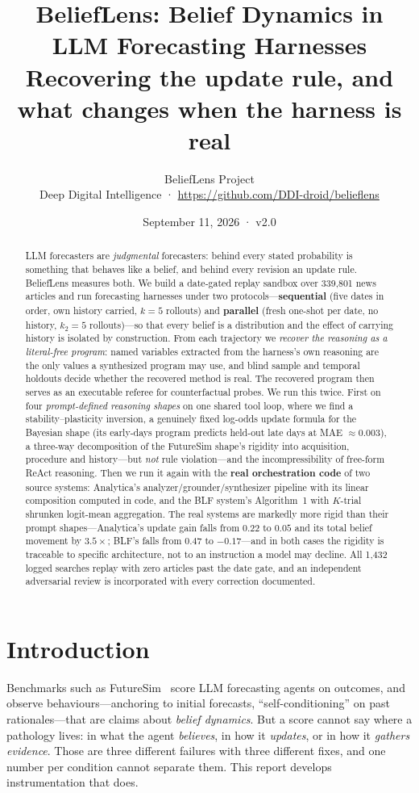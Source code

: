 \documentclass[10pt]{article}
\title{\textbf{BeliefLens: Belief Dynamics in LLM Forecasting Harnesses}\\[3pt]
\Large Recovering the update rule, and what changes when the harness is real}
\author{BeliefLens Project\\\small Deep Digital Intelligence \; · \;
\url{https://github.com/DDI-droid/belieflens}}
\date{September 11, 2026 \; · \; v2.0}
\begin{document}
\maketitle

\begin{abstract}
LLM forecasters are \emph{judgmental} forecasters: behind every stated probability is something
that behaves like a belief, and behind every revision an update rule. BeliefLens measures both.
We build a date-gated replay sandbox over 339{,}801 news articles and run forecasting harnesses
under two protocols---\textbf{sequential} (five dates in order, own history carried, $k{=}5$
rollouts) and \textbf{parallel} (fresh one-shot per date, no history, $k_2{=}5$ rollouts)---so
that every belief is a distribution and the effect of carrying history is isolated by
construction. From each trajectory we \emph{recover the reasoning as a literal-free program}:
named variables extracted from the harness's own reasoning are the only values a synthesized
program may use, and blind sample and temporal holdouts decide whether the recovered method is
real. The recovered program then serves as an executable referee for counterfactual probes.
We run this twice. First on four \emph{prompt-defined reasoning shapes} on one shared tool loop,
where we find a stability--plasticity inversion, a genuinely fixed log-odds update formula for
the Bayesian shape (its early-days program predicts held-out late days at MAE ${\approx}0.003$),
a three-way decomposition of the FutureSim shape's rigidity into acquisition, procedure and
history---but \emph{not} rule violation---and the incompressibility of free-form ReAct reasoning.
Then we run it again with the \textbf{real orchestration code} of two source
systems: Analytica's analyzer/grounder/synthesizer pipeline with its linear composition computed
in code, and the BLF system's Algorithm~1 with $K$-trial shrunken logit-mean aggregation. The
real systems are markedly more rigid than their prompt shapes---Analytica's update gain falls
from $0.22$ to $0.05$ and its total belief movement by $3.5\times$; BLF's falls from $0.47$ to
$-0.17$---and in both cases the rigidity is traceable to specific architecture, not to an
instruction a model may decline. All 1{,}432 logged searches replay with zero articles past the
date gate, and an independent adversarial review is incorporated with every correction documented.
\end{abstract}

\section{Introduction}
Benchmarks such as FutureSim~\cite{futuresim} score LLM forecasting agents on outcomes, and
observe behaviours---anchoring to initial forecasts, ``self-conditioning'' on past
rationales---that are claims about \emph{belief dynamics}. But a score cannot say where a
pathology lives: in what the agent \emph{believes}, in how it \emph{updates}, or in how it
\emph{gathers evidence}. Those are three different failures with three different fixes, and one
number per condition cannot separate them. This report develops instrumentation that does.
\end{document}
